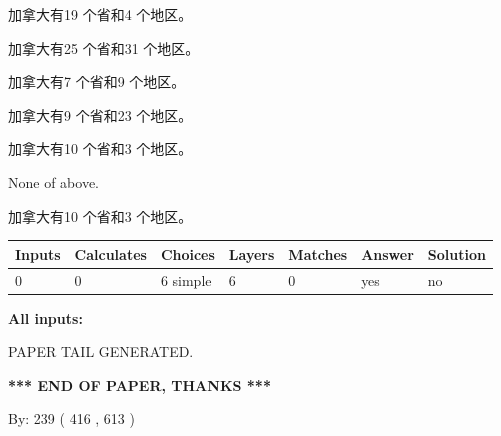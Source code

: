 \documentclass{ctexart}
\begin{document}
 
加拿大有19 个省和4 个地区。
 
 
加拿大有25 个省和31 个地区。
 
 
加拿大有7 个省和9 个地区。
 
 
加拿大有9 个省和23 个地区。
 
 
加拿大有10 个省和3 个地区。
 
 
 None of above.
 
 
\noindent{}
 
 
加拿大有10 个省和3 个地区。
 
 
\noindent{}
 
 
   
   
   
   
\noindent\begin{tabular}{|l|l|l|l|l|l|l|}
 \hline
Inputs & Calculates & Choices & Layers & Matches & Answer & Solution \\ \hline
 0  & 
 0  & 
 6
  simple  
  & 
 6  & 
 0  & 
  yes & 
  no 
  \\ \hline
 \end{tabular}
   
   
   
   
\noindent{}
   
   
   
   
\noindent\vspace{0.1in}\hspace{-0.08in} {\textbf{\Large{All inputs: }}}
   
   
   
   
   
   
 \vspace{0.2in}
 
   
   
\vspace{2.0in} PAPER TAIL GENERATED.
   
   
   
   
\vspace{1.0in} 
{\textbf{\large{ *** END OF PAPER, THANKS *** }}} 
   
   
\hspace{1.0in} By: 
 239 ( 416 ,  613 )
   
\end{document}
